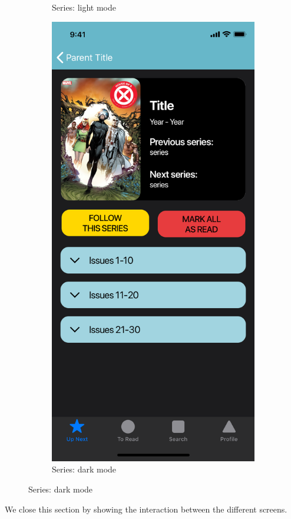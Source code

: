 \begin{figure}[p]
\begin{subfigure}[b]{0.4\textwidth}
    \caption{Series: light mode}
    \label{fig:1}
  \end{subfigure}
  \hfill
  \begin{subfigure}[b]{0.4\textwidth}
    \includegraphics[width=\textwidth]{img/mockups/dark_mode}
    \caption{Series: dark mode}
    \label{fig:2}
  \end{subfigure}
\end{figure}

\clearpage

We close this section by showing the interaction between the different screens.
\vspace{15mm}


